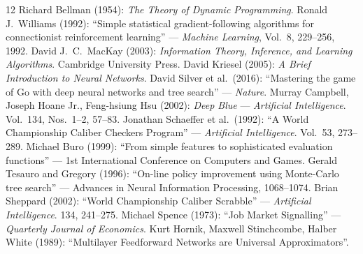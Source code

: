 \documentclass[11pt]{article}
\begin{document}
\begin{thebibliography}{12}
Richard Bellman (1954): \textit{The Theory of Dynamic Programming}.
Ronald J.\ Williams (1992): ``Simple statistical gradient-following algorithms for connectionist
reinforcement learning'' --- \textit{Machine Learning}, Vol.\ 8, 229--256, 1992.
David J.\ C.\ MacKay (2003): \textit{Information Theory, Inference, and Learning Algorithms}. Cambridge University Press.
David Kriesel (2005): \textit{A Brief Introduction to Neural Networks}.
David Silver et al.\ (2016): ``Mastering the game of Go with deep neural networks and tree search'' --- \textit{Nature}.
Murray Campbell, Joseph Hoane Jr., Feng-hsiung Hsu (2002): \textit{Deep Blue} --- \textit{Artificial Intelligence}. Vol.\ 134, Nos.\ 1--2, 57--83.
Jonathan Schaeffer et al.\ (1992): ``A World Championship Caliber Checkers Program'' --- \textit{Artificial Intelligence}. Vol.\ 53, 273--289.
Michael Buro (1999): ``From simple features to sophisticated evaluation functions'' --- 1st
International Conference on Computers and Games.
Gerald Tesauro and Gregory (1996): ``On-line policy improvement using Monte-Carlo tree
search'' --- Advances in Neural Information Processing, 1068--1074.
Brian Sheppard (2002): ``World Championship Caliber Scrabble'' --- \textit{Artificial Intelligence}. 134, 241--275.
Michael Spence (1973): ``Job Market Signalling'' --- \textit{Quarterly Journal of Economics}.
Kurt Hornik, Maxwell Stinchcombe, Halber White (1989): ``Multilayer Feedforward Networks are Universal Approximators''.
\end{thebibliography}
\end{document}
